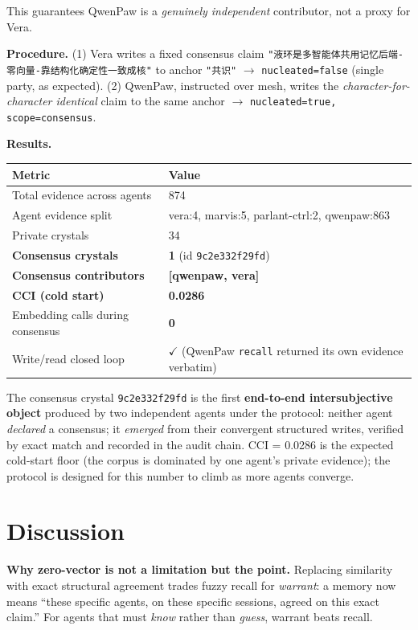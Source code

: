\documentclass[UTF8]{ctexart}
\begin{document}
This guarantees QwenPaw is a \emph{genuinely independent} contributor, not a proxy
for Vera.

\textbf{Procedure.} (1) Vera writes a fixed consensus claim
\texttt{"液环是多智能体共用记忆后端-零向量-靠结构化确定性一致成核"} to anchor \texttt{"共识"}
$\rightarrow$ \texttt{nucleated=false} (single party, as expected). (2) QwenPaw, instructed over
mesh, writes the \emph{character-for-character identical} claim to the same anchor
$\rightarrow$ \texttt{nucleated=true, scope=consensus}.

\textbf{Results.}

\begin{tabular}{l l}
\toprule
Metric & Value \\
\midrule
Total evidence across agents & 874 \\
Agent evidence split & vera:4, marvis:5, parlant-ctrl:2, qwenpaw:863 \\
Private crystals & 34 \\
\textbf{Consensus crystals} & \textbf{1} (id \texttt{9c2e332f29fd}) \\
\textbf{Consensus contributors} & \textbf{[qwenpaw, vera]} \\
\textbf{CCI (cold start)} & \textbf{0.0286} \\
Embedding calls during consensus & \textbf{0} \\
Write/read closed loop & $\checkmark$ (QwenPaw \texttt{recall} returned its own evidence verbatim) \\
\bottomrule
\end{tabular}

\vspace{0.4em}
The consensus crystal \texttt{9c2e332f29fd} is the first \textbf{end-to-end intersubjective
object} produced by two independent agents under the protocol: neither agent
\emph{declared} a consensus; it \emph{emerged} from their convergent structured writes,
verified by exact match and recorded in the audit chain. CCI = 0.0286 is the
expected cold-start floor (the corpus is dominated by one agent's private
evidence); the protocol is designed for this number to climb as more agents
converge.

\section{Discussion}
\textbf{Why zero-vector is not a limitation but the point.} Replacing similarity
with exact structural agreement trades fuzzy recall for \emph{warrant}: a memory now
means ``these specific agents, on these specific sessions, agreed on this exact
claim.'' For agents that must \emph{know} rather than \emph{guess}, warrant beats recall.
\end{document}
